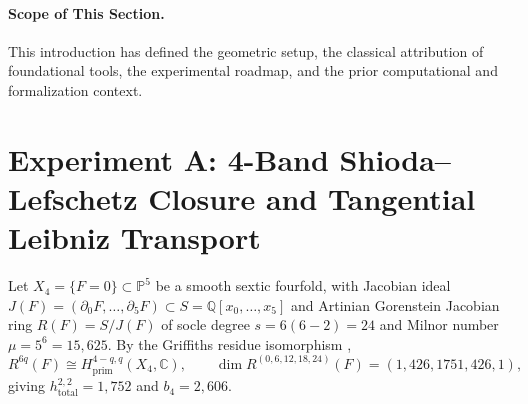 \documentclass[11pt,a4paper]{amsart}
\theoremstyle{definition}
\theoremstyle{remark}
\begin{document}
\paragraph{Scope of This Section.}
This introduction has defined the geometric setup, the classical attribution of foundational tools, the experimental roadmap, and the prior computational and formalization context.

\section{Experiment A: 4-Band Shioda--Lefschetz Closure and Tangential Leibniz Transport}
\label{sec:thmA}

Let $X_4 = \{F = 0\} \subset \mathbb{P}^5$ be a smooth sextic fourfold, with Jacobian ideal $J(F) = (\partial_0 F, \dots, \partial_5 F) \subset S = \mathbb{Q}[x_0,\dots,x_5]$ and Artinian Gorenstein Jacobian ring $R(F) = S / J(F)$ of socle degree $s = 6(6 - 2) = 24$ and Milnor number $\mu = 5^6 = 15,625$. By the Griffiths residue isomorphism \cite{CarlsonGriffiths1980},
\[
R^{6q}(F) \cong H^{4-q,q}_{\mathrm{prim}}(X_4, \mathbb{C}), \qquad \dim R^{(0,6,12,18,24)}(F) = (1, 426, 1751, 426, 1),
\]
giving $h^{2,2}_{\mathrm{total}} = 1,752$ and $b_4 = 2,606$.
\end{document}
